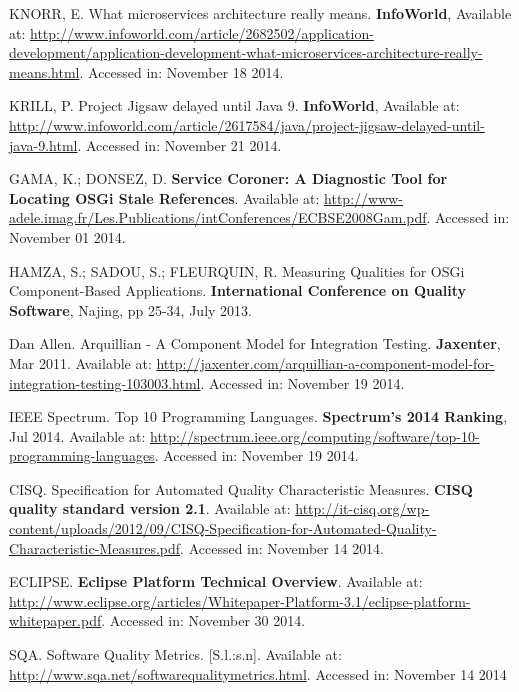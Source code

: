 \documentclass[cic,tc,english]{iiufrgs} %
\begin{document}
\begin{thebibliography}{este-parametro-nao-eh-usado-pelo-estilo-ABNT}
 KNORR, E.
What microservices architecture really means. \textbf{InfoWorld}, Available at: \url{http://www.infoworld.com/article/2682502/application-development/application-development-what-microservices-architecture-really-means.html}. Accessed in: November 18 2014.

 KRILL, P.
Project Jigsaw delayed until Java 9. \textbf{InfoWorld}, Available at: \url{http://www.infoworld.com/article/2617584/java/project-jigsaw-delayed-until-java-9.html}. Accessed in: November 21 2014.

 GAMA, K.; DONSEZ, D.
\textbf{Service Coroner: A Diagnostic Tool for Locating OSGi Stale References}. Available at: \url{http://www-adele.imag.fr/Les.Publications/intConferences/ECBSE2008Gam.pdf}. Accessed in: November 01 2014.

 HAMZA, S.; SADOU, S.; FLEURQUIN, R.
Measuring Qualities for OSGi Component-Based Applications. \textbf{International Conference on Quality Software}, Najing, pp 25-34, July 2013.

 Dan Allen.
Arquillian - A Component Model for Integration Testing. \textbf{Jaxenter}, Mar 2011. 
Available at: \url{http://jaxenter.com/arquillian-a-component-model-for-integration-testing-103003.html}. Accessed in: November 19 2014.

 IEEE Spectrum.
Top 10 Programming Languages. \textbf{Spectrum’s 2014 Ranking}, Jul 2014. Available at: \url{http://spectrum.ieee.org/computing/software/top-10-programming-languages}. Accessed in: November 19 2014. 


 CISQ.
Specification for Automated Quality Characteristic Measures. \textbf{CISQ quality standard version 2.1}. Available at: \url{http://it-cisq.org/wp-content/uploads/2012/09/CISQ-Specification-for-Automated-Quality-Characteristic-Measures.pdf}. Accessed in: November 14 2014.

 ECLIPSE.
\textbf{Eclipse Platform Technical Overview}. Available at: \url{http://www.eclipse.org/articles/Whitepaper-Platform-3.1/eclipse-platform-whitepaper.pdf}. Accessed in: November 30 2014.

 SQA.
Software Quality Metrics. [S.l.:s.n]. Available at: \url{http://www.sqa.net/softwarequalitymetrics.html}. Accessed in: November 14 2014


\end{thebibliography}
\end{document}
